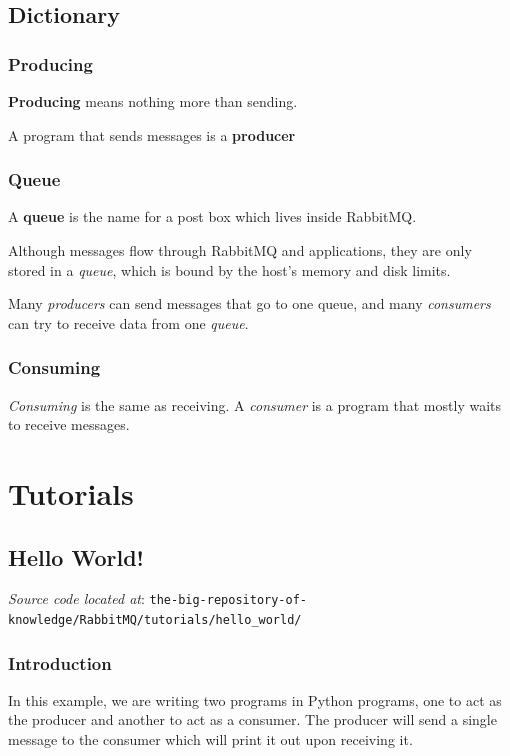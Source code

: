 \documentclass{article}
\begin{document}
\subsection{Dictionary}

\subsubsection{Producing}

\textbf{Producing} means nothing more than sending.

A program that sends messages is a \textbf{producer}

\subsubsection{Queue}

A \textbf{queue} is the name for a post box which lives inside RabbitMQ.

Although messages flow through RabbitMQ and applications, they are only stored in a \textit{queue}, which is bound by the host's memory and disk limits. 

Many \textit{producers} can send messages that go to one queue, and many \textit{consumers} can try to receive data from one \textit{queue}.

\subsubsection{Consuming}

\textit{Consuming} is the same as receiving. A \textit{consumer} is a program that mostly waits to receive messages.

\section{Tutorials}

\subsection{Hello World!}

\textit{Source code located at}: \verb|the-big-repository-of-knowledge/RabbitMQ/tutorials/hello_world/|

\subsubsection{Introduction}

In this example, we are writing two programs in Python programs, one to act as the producer and another to act as a consumer. The producer will send a single message to the consumer which will print it out upon receiving it. 
\end{document}
